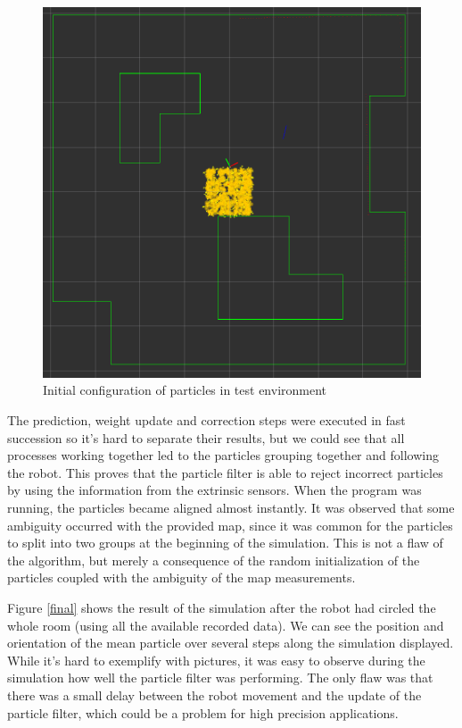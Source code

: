 \documentclass[journal]{IEEEtran}
\begin{document}
\begin{figure}[H]
	\centering
	\includegraphics[width=0.8\linewidth]{figures/initial.png}
	\caption{Initial configuration of particles in test environment}
	\label{initial}
\end{figure}

The prediction, weight update and correction steps were executed in fast succession so it's hard to separate their results, but we could see that all processes working together led to the particles grouping together and following the robot. This proves that the particle filter is able to reject incorrect particles by using the information from the extrinsic sensors. When the program was running, the particles became aligned almost instantly. It was observed that some ambiguity occurred with the provided map, since it was common for the particles to split into two groups at the beginning of the simulation. This is not a flaw of the algorithm, but merely a consequence of the random initialization of the particles coupled with the ambiguity of the map measurements.

Figure \ref{final} shows the result of the simulation after the robot had circled the whole room (using all the available recorded data). We can see the position and orientation of the mean particle over several steps along the simulation displayed. While it's hard to exemplify with pictures, it was easy to observe during the simulation how well the particle filter was performing. The only flaw was that there was a small delay between the robot movement and the update of the particle filter, which could be a problem for high precision applications.
\end{document}
